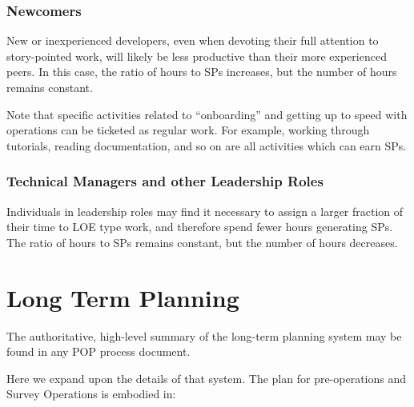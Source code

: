 \subsubsection{Newcomers}
\label{sec:newcomers}

New or inexperienced developers, even when devoting their full attention to \gls{story}-pointed work, will likely be less productive than their more experienced peers.
In this case, the ratio of hours to \glspl{SP} increases, but the number of hours remains constant.

Note that specific activities related to ``onboarding'' and getting up to speed with operations can be ticketed as regular work.
For example, working through tutorials, reading documentation, and so on are all activities which can earn \glspl{SP}.

\subsubsection{Technical Managers and other Leadership Roles}

Individuals in leadership roles may find it necessary to assign a larger fraction of their time to \gls{LOE} type work, and therefore spend fewer hours generating \glspl{SP}.
The ratio of hours to \glspl{SP} remains constant, but the number of hours decreases.


\section{Long Term Planning}
\label{sec:long-term-plan}

The authoritative, high-level summary of the long-term planning system may be found in any POP process document.

Here we expand upon the details of that system.
The plan for pre-operations and Survey Operations is embodied in:


